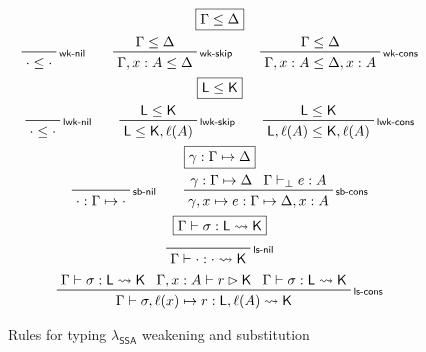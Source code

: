 \documentclass[acmsmall,screen,review]{acmart}
\newcommand{\ms}[1]{\ensuremath{\mathsf{#1}}}
\newcommand{\bhyp}[2]{#1 : #2}
\newcommand{\lhyp}[2]{#1(#2)}
\newcommand{\rle}[1]{{\scriptsize\textsf{#1}}}
\newcommand{\hasty}[4]{#1 \vdash_{#2} #3: {#4}}
\newcommand{\haslb}[3]{#1 \vdash #2 \rhd #3}
\newcommand{\issubst}[3]{#1: #2 \mapsto #3}
\newcommand{\lbsubst}[4]{#1 \vdash #2: #3 \rightsquigarrow #4}
\newcommand{\isotopessa}{\(\lambda_{\ms{SSA}}\)}
\begin{document}
\begin{figure}
  \begin{gather*}
    \boxed{\Gamma \leq \Delta} \\
    \prftree[r]{\rle{wk-nil}}{}{\cdot \leq \cdot} \qquad
    \prftree[r]{\rle{wk-skip}}{\Gamma \leq \Delta}{\Gamma, \bhyp{x}{A} \leq \Delta} \qquad
    \prftree[r]{\rle{wk-cons}}{\Gamma \leq \Delta}
      {\Gamma, \bhyp{x}{A} \leq \Delta, \bhyp{x}{A}} \\
    \boxed{\ms{L} \leq \ms{K}} \\
    \prftree[r]{\rle{lwk-nil}}{}{\cdot \leq \cdot} \qquad
    \prftree[r]{\rle{lwk-skip}}{\ms{L} \leq \ms{K}}{\ms{L} \leq \ms{K}, \lhyp{\ell}{A}} \qquad
    \prftree[r]{\rle{lwk-cons}}{\ms{L} \leq \ms{K}}
      {\ms{L}, \lhyp{\ell}{A} \leq \ms{K}, \lhyp{\ell}{A}} \\
    \boxed{\issubst{\gamma}{\Gamma}{\Delta}} \\
    \prftree[r]{\rle{sb-nil}}{}{\issubst{\cdot}{\Gamma}{\cdot}} \qquad
    \prftree[r]{\rle{sb-cons}}{\issubst{\gamma}{\Gamma}{\Delta}}{\hasty{\Gamma}{\bot}{e}{A}}
      {\issubst{\gamma, x \mapsto e}{\Gamma}{\Delta, \bhyp{x}{A}}}
       \\
    \boxed{\lbsubst{\Gamma}{\sigma}{\ms{L}}{\ms{K}}} \\
    \prftree[r]{\rle{ls-nil}}{}{\lbsubst{\Gamma}{\cdot}{\cdot}{\ms{K}}}
    \\
    \prftree[r]{\rle{ls-cons}}
      {\lbsubst{\Gamma}{\sigma}{\ms{L}}{\ms{K}}}{\haslb{\Gamma, \bhyp{x}{A}}{r}{\ms{K}}}
      {\lbsubst{\Gamma}{\sigma}{\ms{L}}{\ms{K}}}
      {\lbsubst{\Gamma}{\sigma, \ell(x) \mapsto r}{\ms{L}, \lhyp{\ell}{A}}{\ms{K}}}
  \end{gather*}
  \caption{Rules for typing \isotopessa{} weakening and substitution}
  \Description{}
  \label{fig:ssa-meta-rules}
\end{figure}
\end{document}
